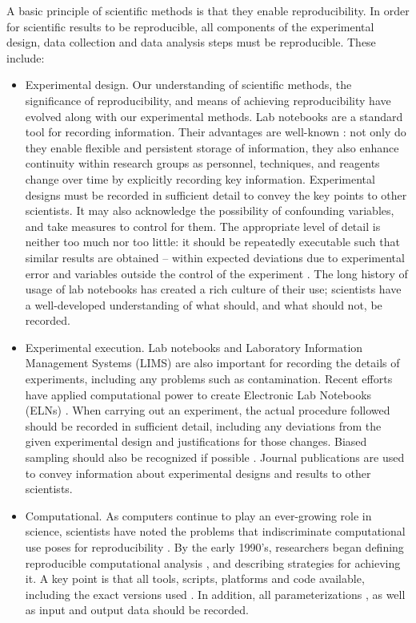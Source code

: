 A basic principle of scientific methods is that they enable reproducibility.  
In order for scientific results to be reproducible, all components of the 
experimental design, data collection and data analysis steps must be 
reproducible.  These include:
\begin{itemize}

  \item Experimental design.  Our understanding of scientific methods, the 
  significance of reproducibility, and means of achieving reproducibility 
  have evolved along with our experimental methods.  
  Lab notebooks are a standard tool for recording information.  Their 
  advantages are well-known \cite{rubacha2011eln}: not only do they enable 
  flexible and persistent storage of information, they also enhance 
  continuity within research groups as personnel, techniques, 
  and reagents change over time by explicitly recording key information.
  Experimental designs must be recorded in sufficient detail to convey the key
  points to other scientists.  It may also acknowledge the possibility of 
  confounding variables, and take measures to control for them.
  The appropriate level of detail is neither too much nor too little:
  it should be repeatedly executable such that similar results are obtained 
  -- within expected deviations due to experimental error and variables 
  outside the control of the experiment \cite{drummond2012reproducible}.
  The long history of usage of lab notebooks has created a rich culture of
  their use; scientists have a well-developed understanding of what should,
  and what should not, be recorded.

  \item Experimental execution.  Lab notebooks and Laboratory Information 
  Management Systems 
  (LIMS) are also important for recording the details of experiments, including 
  any problems such as contamination.  Recent efforts have applied 
  computational power to create Electronic Lab Notebooks (ELNs)
  \cite{talbott2005eln, rubacha2011eln, myers2001eln}.
  When carrying out an experiment, the actual procedure followed should be
  recorded in sufficient detail, including any deviations from the given 
  experimental design and justifications for those changes.
  Biased sampling should also be recognized if possible
  \cite{savovic2012influence, simmons2011false}.
  Journal publications are used to convey information about experimental
  designs and results to other scientists.  

  \item Computational.  As computers continue to play an ever-growing role in 
  science, scientists have noted the problems that indiscriminate computational 
  use poses for reproducibility \cite{donoho2009, peng2011reproducible}.  
  By the early 1990's, researchers began defining reproducible 
  computational analysis \cite{donoho_wavelab}, and describing strategies for 
  achieving it.  A key point is that all tools, scripts, platforms and code 
  available, including the exact versions used
   \cite{ince2012open, nekrutenko2012next, blankenberg2014dissemination}.
  In addition, all parameterizations \cite{landis2012call}, as well
  as input and output data should be recorded.


\end{itemize}
